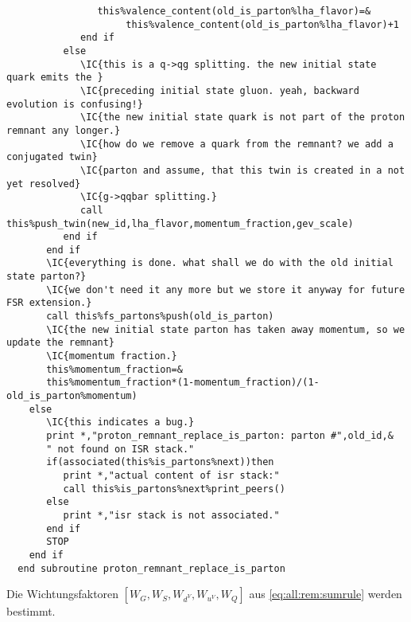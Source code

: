 \begin{Verbatim}
                this%valence_content(old_is_parton%lha_flavor)=&
                     this%valence_content(old_is_parton%lha_flavor)+1
             end if
          else
             \IC{this is a q->qg splitting. the new initial state quark emits the }
             \IC{preceding initial state gluon. yeah, backward evolution is confusing!}
             \IC{the new initial state quark is not part of the proton remnant any longer.}
             \IC{how do we remove a quark from the remnant? we add a conjugated twin}
             \IC{parton and assume, that this twin is created in a not yet resolved}
             \IC{g->qqbar splitting.}
             call this%push_twin(new_id,lha_flavor,momentum_fraction,gev_scale)
          end if
       end if
       \IC{everything is done. what shall we do with the old initial state parton?}
       \IC{we don't need it any more but we store it anyway for future FSR extension.}
       call this%fs_partons%push(old_is_parton)
       \IC{the new initial state parton has taken away momentum, so we update the remnant}
       \IC{momentum fraction.}
       this%momentum_fraction=&
       this%momentum_fraction*(1-momentum_fraction)/(1-old_is_parton%momentum)
    else
       \IC{this indicates a bug.}
       print *,"proton_remnant_replace_is_parton: parton #",old_id,&
       " not found on ISR stack."
       if(associated(this%is_partons%next))then
          print *,"actual content of isr stack:"
          call this%is_partons%next%print_peers()
       else
          print *,"isr stack is not associated."
       end if
       STOP
    end if
  end subroutine proton_remnant_replace_is_parton
\end{Verbatim}
Die Wichtungsfaktoren $[W_G,W_S,W_{d^V},W_{u^V},W_Q]$ aus \eqref{eq:all:rem:sumrule} werden bestimmt.
